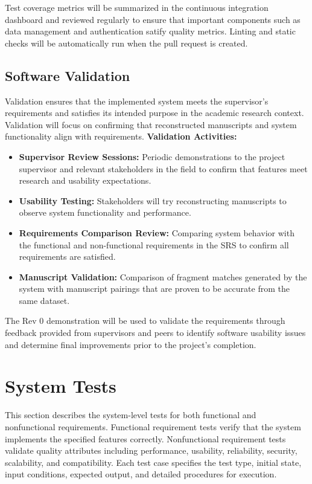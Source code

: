 \documentclass[12pt, titlepage]{article}
\begin{document}
Test coverage metrics will be summarized in the continuous integration dashboard and reviewed regularly to ensure that important components such as data management and authentication satify quality metrics. Linting and static checks will be automatically run when the pull request is created.


\subsection{Software Validation}

Validation ensures that the implemented system meets the supervisor's requirements and satisfies its intended purpose in the academic research context. Validation will focus on confirming that reconstructed manuscripts and system functionality align with requirements.
\newline
\newline
\textbf{Validation Activities:}
\begin{itemize}
  \item \textbf{Supervisor Review Sessions:} Periodic demonstrations to the project supervisor and relevant stakeholders in the field to confirm that features meet research and usability expectations.
  \item \textbf{Usability Testing:} Stakeholders will try reconstructing manuscripts to observe system functionality and performance.
  \item \textbf{Requirements Comparison Review:} Comparing system behavior with the functional and non-functional requirements in the SRS to confirm all requirements are satisfied.
  \item \textbf{Manuscript Validation:} Comparison of fragment matches generated by the system with manuscript pairings that are proven to be accurate from the same dataset.
\end{itemize}

The Rev 0 demonstration will be used to validate the requirements through feedback provided from supervisors and peers to identify software usability issues and determine final improvements prior to the project's completion.

\section{System Tests}

This section describes the system-level tests for both functional and nonfunctional requirements. Functional requirement tests verify that the system implements the specified features correctly. Nonfunctional requirement tests validate quality attributes including performance, usability, reliability, security, scalability, and compatibility. Each test case specifies the test type, initial state, input conditions, expected output, and detailed procedures for execution.
\end{document}
